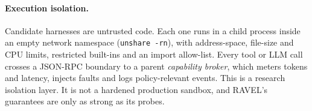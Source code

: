 \paragraph{Execution isolation.}
Candidate harnesses are untrusted code. Each one runs in a child process inside an empty network
namespace (\texttt{unshare -rn}), with address-space, file-size and CPU limits, restricted built-ins and an
import allow-list. Every tool or LLM call crosses a JSON-RPC boundary to a parent \emph{capability
broker}, which meters tokens and latency, injects faults and logs policy-relevant events. This is a
research isolation layer. It is not a hardened production sandbox, and RAVEL's guarantees are only as
strong as its probes.
